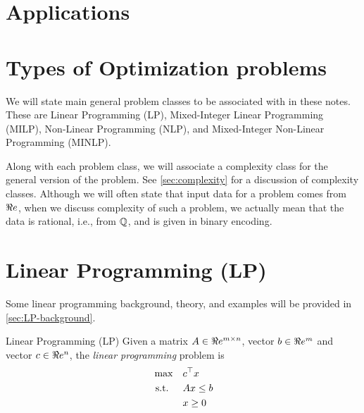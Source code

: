 \section{Applications}


\section{Types of Optimization problems}
We will state main general problem classes to be associated with in these notes.  These are Linear Programming (LP), Mixed-Integer Linear Programming (MILP), Non-Linear Programming (NLP), and Mixed-Integer Non-Linear Programming (MINLP).  




Along with each problem class, we will associate a complexity class for the general version of the problem.  See \autoref{sec:complexity} for a discussion of complexity classes.  Although we will often state that input data for a problem comes from $\Re e$, when we discuss complexity of such a problem, we actually mean that the data is rational, i.e., from ${\mathbb{Q}}$, and is given in binary encoding.

\section{Linear Programming (LP)}
Some linear programming background, theory, and examples will be provided in \autoref{sec:LP-background}.
\begin{general}{Linear Programming (LP)}{\polynomial}
Given a matrix $A \in \Re e^{m\times n}$, vector $b \in \Re e^m$ and vector $c \in \Re e^n$, the \emph{linear programming} problem is
\begin{equation}
\label{eq:LP}
\begin{split}
\max \quad & c^\top x\\
\mbox{ s.t. }  \quad & Ax \leq b\\
& x \geq 0
\end{split}
\end{equation}
\end{general}

